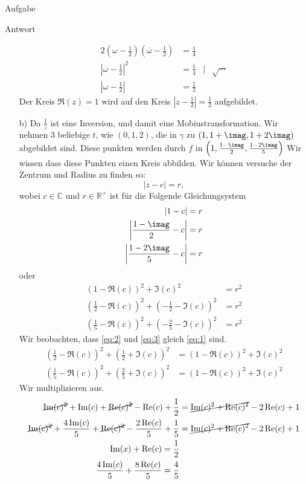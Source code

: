 \documentclass{scrartcl}
\def\mbb#1{\mathbb{#1}}
\def\bC{\mbb{C}}
\def\bR{\mbb{R}}
\begin{document}
\begin{section}{Aufgabe}
\begin{subsection}{Antwort}
\begin{itemize}
\begin{alignat*}{2}
  \left(\omega-\frac{1}{2}\right)\left(\overline{\omega}-\frac{1}{2}\right)&=\frac{1}{4}\\
  \left|\omega-\frac{1}{2}\right|^2&=\frac{1}{4} &|&\sqrt{\cdots}\\
  \left|\omega-\frac{1}{2}\right|&=\frac{1}{2}
\end{alignat*}
Der Kreis \(\Re(z)=1\) wird auf den Kreis \(\left|z-\frac{1}{2}\right|=\frac{1}{2}\) aufgebildet.
\item[b)] Da $\frac{1}{z}$ ist eine Inversion, und damit eine Mobiustransformation. Wir nehmen 3 beliebige $t$, wie $\left(0,1,2\right)$, die in $\gamma$ zu $\left(1,1+\imag,1+2\imag\right)$ abgebildet sind. Diese punkten werden durch $f$ in $\left(1,\frac{1-\imag}{2},\frac{1-2\imag}{5}\right)$
Wir wissen dass diese Punkten einen Kreis abbilden. Wir können versuche der Zentrum und Radius zu finden so:
\[\left|z-c\right|=r,\] wobei $c\in \bC$ und $r \in \bR^+$ ist für die Folgende Gleichungsystem
\begin{align*}
    \left|1-c\right|&=r\\
    \left|\frac{1-\imag}{2}-c\right|&=r\\
    \left|\frac{1-2\imag}{5}-c\right|&=r
\end{align*}
oder
\begin{align}
    (1-\Re(c))^2+\Im(c)^2&=r^2 \label{eq:1}\\
    \left(\frac{1}{2}-\Re(c)\right)^2+\left(-\frac{1}{2}-\Im(c)\right)^2&=r^2\label{eq:2}\\
    \left(\frac{1}{5}-\Re(c)\right)^2+\left(-\frac{2}{5}-\Im(c)\right)^2&=r^2\label{eq:3}
\end{align}
Wir beobachten, dass \eqref{eq:2} und \eqref{eq:3} gleich \eqref{eq:1} sind.
\begin{align*}
    \left(\frac{1}{2}-\Re(c)\right)^2+\left(\frac{1}{2}+\Im(c)\right)^2&=(1-\Re(c))^2+\Im(c)^2\\
    \left(\frac{1}{5}-\Re(c)\right)^2+\left(\frac{2}{5}+\Im(c)\right)^2&=(1-\Re(c))^2+\Im(c)^2
\end{align*}
Wir multiplizieren aus.
\begin{align*}
    \cancel{\Im(c)^2}+\Im(c)+\cancel{\Re(c)^2}-\Re(c)+\frac{1}{2}&=\cancel{\Im(c)^2+\Re(c)^2}-2 \Re(c)+1\\
    \cancel{\Im(c)^2}+\frac{4 \Im(c)}{5}+\cancel{\Re(c)^2}-\frac{2 \Re(c)}{5}+\frac{1}{5}&=\cancel{\Im(c)^2+\Re(c)^2}-2 \Re(c)+1\\
    \Im(x)+\Re(c)=\frac{1}{2}\\
    \frac{4 \Im(c)}{5}+\frac{8 \Re(c)}{5}=\frac{4}{5}

\end{align*}
\end{itemize}
\end{subsection}
\end{section}
\end{document}
